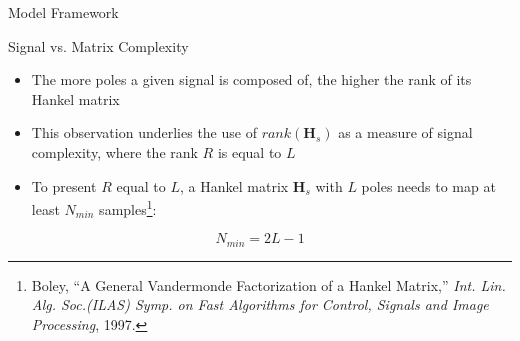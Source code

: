 \documentclass{beamer}
\begin{document}
    \begin{frame}{Model Framework}
    
        \begin{block}{Signal vs. Matrix Complexity}
            \begin{itemize}
                \item The more poles a given signal is composed of, the higher the rank of its Hankel matrix
                \item This observation underlies the use of $rank ({\mathbf{H}}_s)$ as a measure of signal complexity, where the rank $R$ is equal to $L$
            \end{itemize}
        \end{block}
        
        \vspace{10pt}
        
        \begin{itemize}
            \item To present $R$ equal to $L$, a Hankel matrix ${\mathbf{H}}_s$ with $L$ poles needs to map at least $N_{min}$ samples\footnote{Boley, ``A General Vandermonde Factorization of a {Hankel} Matrix,'' \textit{Int. Lin. Alg. Soc.(ILAS) Symp. on Fast Algorithms for Control, Signals and Image Processing}, 1997.}:
        \end{itemize}
        
        \begin{equation}
            N_{min} = 2L - 1 \label{eq:N_min-Samples}
        \end{equation}

    \end{frame}
    
\end{document}

